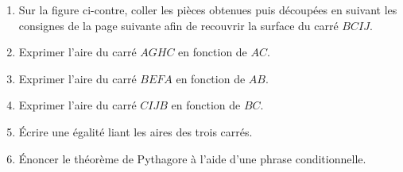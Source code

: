 \begin{activite}
    \begin{minipage}{0.4\linewidth}
        \begin{enumerate}
            \item Sur la figure ci-contre, coller les pièces     
            obtenues puis découpées en suivant les consignes de la page suivante afin de recouvrir la surface du carré $BCIJ$.
            \item Exprimer l'aire du carré $AGHC$ en fonction de $AC$.\smallskip\\\makebox[\linewidth]{\dotfill}
            \item Exprimer l'aire du carré $BEFA$ en fonction de $AB$.\smallskip\\\makebox[\linewidth]{\dotfill}
            \item Exprimer l'aire du carré $CIJB$ en fonction de $BC$.\smallskip\\\makebox[\linewidth]{\dotfill}
            \item Écrire une égalité liant les aires des trois carrés.\smallskip\\\makebox[\linewidth]{\dotfill}
            \item Énoncer le théorème de Pythagore à l'aide d'une phrase conditionnelle.\smallskip\\\makebox[1.7\linewidth]{\dotfill}\medskip\\\makebox[1.7\linewidth]{\dotfill}\medskip\\\makebox[1.7\linewidth]{\dotfill}\medskip\\\makebox[1.7\linewidth]{\dotfill}
        \end{enumerate}
    \end{minipage}
    \hfill
    \begin{minipage}{0.55\linewidth}
\end{minipage}
\end{activite}
